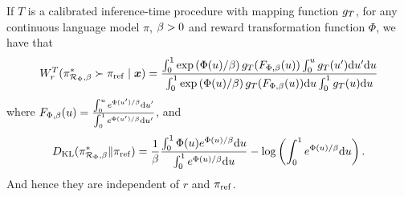 \begin{theorem} \label{thm:calibrated_procedure_extended}
If $T$ is a calibrated inference-time procedure with mapping function $g_{T}$, for any continuous language model $\pi$, $\beta > 0$ and reward transformation function $\Phi$,  we have that 
\[W^T_r(\pi^*_{\mathcal{R}_{\Phi}, \beta} \succ {\pi_{\rm ref}} \mid {\bm{x}}) = \frac{\int_{0}^1 \exp \left(\Phi(u)/\beta\right)g_T( F_{\Phi, \beta}(u) )\int_{0}^{u} g_T (u') {\rm d} u' {\rm d} u}{\int_{0}^1 \exp \left(\Phi(u)/\beta\right) g_T( F_{\Phi, \beta}(u) ) {\rm d} u \int_{0}^1 g_{T}(u){\rm d} u} 
\] where $F_{\Phi, \beta}(u)= \frac{\int_{0}^u e^{\Phi(u')/\beta} {\rm d} u'}{\int_{0}^1 e^{\Phi(u')/\beta} {\rm d} u'}$, and \[D_{\text{KL}}(\pi^*_{\mathcal{R}_{\Phi}, \beta} \| {\pi_{\rm ref}}) = 
\frac{1}{\beta}  \frac{ \int_{0}^1 \Phi(u) e^{\Phi(u)/\beta} {\rm d} u }{\int_{0}^1 e^{\Phi(u)/\beta} {\rm d} u} - \log \left(\int_{0}^1 e^{\Phi(u)/\beta} {\rm d} u\right).
\] 
And hence they are independent of $r$ and ${\pi_{\rm ref}}$.
\end{theorem}
